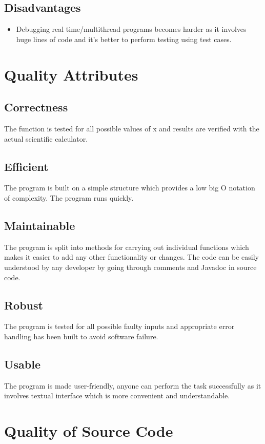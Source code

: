 \documentclass[12pt]{report}
\begin{document}
\subsection{Disadvantages}
\begin{itemize}
    \item Debugging real time/multithread programs becomes harder as it involves huge lines of code and it’s better to perform testing using test cases.
\end{itemize}

\newpage
\section{Quality Attributes}
\subsection{Correctness}
The function is tested for all possible values of x and results are verified with the actual scientific calculator. 
\subsection{Efficient}
The program is built on a simple structure which provides a low big O notation of complexity. The program runs quickly.
\subsection{Maintainable}
The program is split into methods for carrying out individual functions which makes it easier to add any other functionality or changes. The code can be easily understood by any developer by going through comments and Javadoc in source code. 
\subsection{Robust}
The program is tested for all possible faulty inputs and appropriate error handling has been built to avoid software failure.
\subsection{Usable}
The program is made user-friendly, anyone can perform the task successfully as it involves textual interface which is more convenient and understandable.

\newpage
\section{Quality of Source Code}
\end{document}

